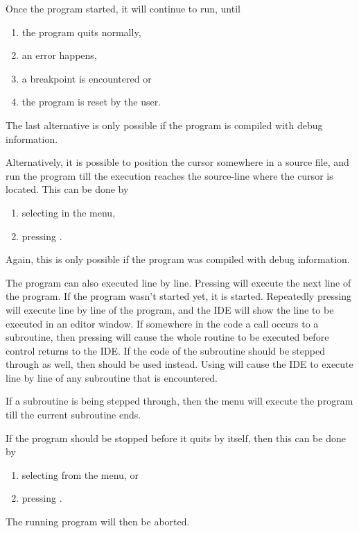 
Once the program started, it will continue to run, until
\begin{enumerate}
\item the program quits normally,
\item an error happens,
\item a breakpoint is encountered or
\item the program is reset by the user.
\end{enumerate}
The last alternative is only possible if the program is compiled
with debug information.

Alternatively, it is possible to position the cursor somewhere in a
source file, and run the program till the execution reaches the
source-line where the cursor is located. This can be done by
\begin{enumerate}
\item selecting  in the menu,
\item pressing .
\end{enumerate}
Again, this is only possible if the program was compiled with debug
information.

The program can also executed line by line. Pressing  will
execute the next line of the program. If the program wasn't started
yet, it is started. Repeatedly pressing  will execute line
by line of the program, and the IDE will show the line to be executed
in an editor window. If somewhere in the code a call occurs to a subroutine,
then pressing  will cause the whole routine to be executed before
control returns to the IDE. If the code of the subroutine should be stepped
through as well, then  should be used instead. Using  will
cause the IDE to execute line by line of any subroutine that is encountered.

If a subroutine is being stepped through, then the  menu
will execute the program till the current subroutine ends.

If the program should be stopped before it quits by itself, then this can be
done by
\begin{enumerate}
\item selecting  from the menu, or
\item pressing .
\end{enumerate}
The running program will then be aborted.

